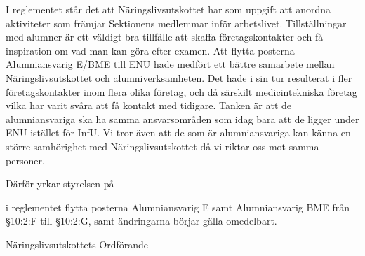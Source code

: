 \documentclass[../_main/handlingar.tex]{subfiles}
\begin{document}
I reglementet står det att Näringslivsutskottet har som uppgift att anordna aktiviteter som främjar Sektionens medlemmar inför arbetslivet. Tillställningar med alumner är ett väldigt bra tillfälle att skaffa företagskontakter och få inspiration om vad man kan göra efter examen. Att flytta posterna Alumniansvarig E/BME till ENU hade medfört ett bättre samarbete mellan Näringslivsutskottet och alumniverksamheten. Det hade i sin tur resulterat i fler företagskontakter inom flera olika företag, och då särskilt medicintekniska företag vilka har varit svåra att få kontakt med tidigare. Tanken är att de alumniansvariga ska ha samma ansvarsområden som idag bara att de ligger under ENU istället för InfU. Vi tror även att de som är alumniansvariga kan känna en större samhörighet med Näringslivsutskottet då vi riktar oss mot samma personer.

Därför yrkar styrelsen på

\begin{attsatser}
    \att i reglementet flytta posterna Alumniansvarig E samt Alumniansvarig BME från \S10:2:F till \S10:2:G, samt
    \att ändringarna börjar gälla omedelbart.
\end{attsatser}

\begin{signatures}{1}
    \ist
    \signature{Josefine Sandström}{Näringslivsutskottets Ordförande}
\end{signatures}
\end{document}
